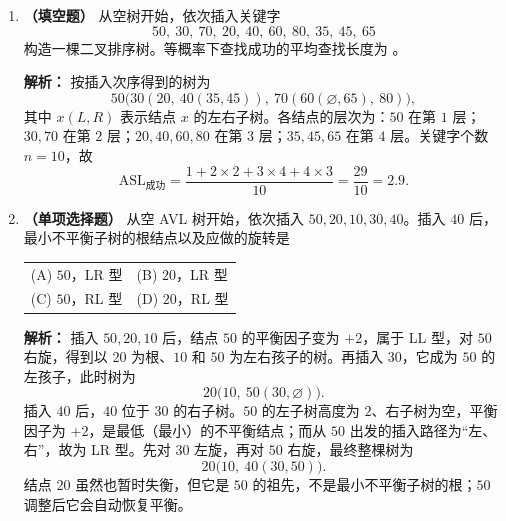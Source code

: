 \begin{enumerate}
\ifshowsolutions\par\noindent\textbf{解析：} 查找第 $i$ 个元素需比较 $i$ 次，故
\[
\mathrm{ASL}_{\text{成功}}=\frac{1}{100}\sum_{i=1}^{100}i=\frac{5050}{100}=50.5.
\]
查找失败时，从下标 $100$ 一路比较到下标 $0$ 的哨兵才停止，共比较 $100+1=101$ 次。哨兵只省去了每轮的越界判断，并不减少关键字比较次数。
\par\noindent{}\else \answerarea \fi

\vspace{6pt}

\item \textbf{（填空题）} 从空树开始，依次插入关键字
\[
50,\ 30,\ 70,\ 20,\ 40,\ 60,\ 80,\ 35,\ 45,\ 65
\]
构造一棵二叉排序树。等概率下查找成功的平均查找长度为 \underline{\hspace{2.6cm}}。

\ifshowsolutions\par\noindent\textbf{解析：} 按插入次序得到的树为
\[
50\bigl(30(20,\ 40(35,45)),\ 70(60(\varnothing,65),\ 80)\bigr),
\]
其中 $x(L,R)$ 表示结点 $x$ 的左右子树。各结点的层次为：$50$ 在第 $1$ 层；$30,70$ 在第 $2$ 层；$20,40,60,80$ 在第 $3$ 层；$35,45,65$ 在第 $4$ 层。关键字个数 $n=10$，故
\[
\mathrm{ASL}_{\text{成功}}
=\frac{1+2\times2+3\times4+4\times3}{10}
=\frac{29}{10}=2.9.
\]
\par\noindent{}\else \answerarea \fi

\vspace{6pt}

\item \textbf{（单项选择题）} 从空 AVL 树开始，依次插入 $50,20,10,30,40$。插入 $40$ 后，最小不平衡子树的根结点以及应做的旋转是
\begin{center}
\begin{tabular}{ll}
(A) $50$，LR 型 & (B) $20$，LR 型 \\[6pt]
(C) $50$，RL 型 & (D) $20$，RL 型
\end{tabular}
\end{center}

\ifshowsolutions\par\noindent\textbf{解析：} 插入 $50,20,10$ 后，结点 $50$ 的平衡因子变为 $+2$，属于 LL 型，对 $50$ 右旋，得到以 $20$ 为根、$10$ 和 $50$ 为左右孩子的树。再插入 $30$，它成为 $50$ 的左孩子，此时树为
\[
20\bigl(10,\ 50(30,\varnothing)\bigr).
\]
插入 $40$ 后，$40$ 位于 $30$ 的右子树。$50$ 的左子树高度为 $2$、右子树为空，平衡因子为 $+2$，是最低（最小）的不平衡结点；而从 $50$ 出发的插入路径为“左、右”，故为 LR 型。先对 $30$ 左旋，再对 $50$ 右旋，最终整棵树为
\[
20\bigl(10,\ 40(30,50)\bigr).
\]
结点 $20$ 虽然也暂时失衡，但它是 $50$ 的祖先，不是最小不平衡子树的根；$50$ 调整后它会自动恢复平衡。
\par\noindent{}\else \answerarea \fi


\end{enumerate}

